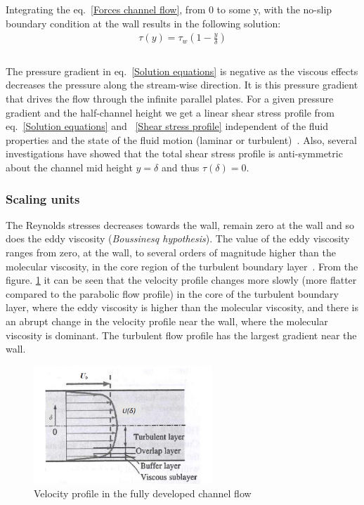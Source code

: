 Integrating the eq.~\ref{Forces channel flow}, from 0 to some y, with the no-slip boundary condition at the wall results in the following solution:
\begin{equation}
\label{Shear stress profile}
\begin{split}
\tau\left(y\right) = \tau_w \left(1 - \frac{y}{\delta}\right)\\
\end{split}
\end{equation}\\ 
%
The pressure gradient in eq.~\ref{Solution equations} is negative as the viscous effects decreases the pressure along the stream-wise direction. It is this pressure gradient that drives the flow through the infinite parallel plates. For a given pressure gradient and the half-channel height we get a linear shear stress profile from eq.~\ref{Solution equations} and ~\ref{Shear stress profile} independent of the fluid properties and the state of the fluid motion (laminar or turbulent)~\cite{pope:book}.
Also, several investigations have showed that the total shear stress
profile is anti-symmetric about the channel mid height $ y=\delta $ and thus $\tau\left(\delta\right) = 0$.
%
\subsubsection{Scaling units}
The Reynolds stresses decreases towards the wall, remain zero at the wall and so does the eddy viscosity (\emph{Boussinesq hypothesis}). The value of the eddy viscosity ranges from zero, at the wall, to several orders of magnitude higher than the molecular viscosity, in the core region of the turbulent boundary layer~\cite{cengel:book}. From the figure. \ref{TFlow} it can be seen that the velocity profile changes more slowly (more flatter compared to the parabolic flow profile) in the core of the turbulent boundary layer, where the eddy viscosity is higher than the molecular viscosity, and there is an abrupt change in the velocity profile near the wall, where the molecular viscosity is dominant. The turbulent flow profile has the largest gradient near the wall. 
\begin{figure}[h]
    \centering
    \includegraphics[width=0.6\textwidth]{figur/Turbulent_profile.png}
    \caption{Velocity profile in the fully developed channel flow ~\cite{cengel:book}}
    \label{TFlow}
\end{figure}

